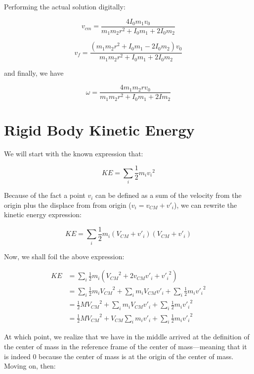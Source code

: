 \documentclass[letterpaper]{article}
\begin{document}
Performing the actual solution digitally:

\begin{equation}
   v_{cm} = \frac{4I_0m_1v_0}{m_1m_2r^2+I_0m_1+2I_0m_2} 
\end{equation}

\begin{equation}
   v_f = \frac{(m_1m_2r^2 + I_0m_1 - 2I_0m_2)v_0}{m_1m_2r^2 + I_0m_1+2I_0m_2} 
\end{equation}

and finally, we have

\begin{equation}
   \omega = \frac{4m_1m_2rv_0}{m_1m_2r^2+I_0m_1+2Im_2} 
\end{equation}

\section{Rigid Body Kinetic Energy}
\label{sec:org9559dec}
We will start with the known expression that:

\begin{equation}
   KE = \sum_i \frac{1}{2} m_i{v_i}^2
\end{equation}

Because of the fact a point \(v_i\) can be defined as a sum of the velocity from the origin plus the displace from from origin (\(v_i = v_{CM}+v'_i\)), we can rewrite the kinetic energy expression:

\begin{equation}
   KE = \sum_i  \frac{1}{2}  m_i (V_{CM}+v'_i)(V_{CM}+v'_i)
\end{equation}

Now, we shall foil the above expression:

\begin{align}
   KE &= \sum_i  \frac{1}{2}  m_i ({V_{CM}}^2+2v_{CM}v'_i+{v'_i}^2) \\
&= \sum_i  \frac{1}{2}  m_i {V_{CM}}^2+ \sum_i  m_i V_{CM}v'_i+\sum_i  \frac{1}{2}  m_i {v'_i}^2 \\
&= \frac{1}{2}  M {V_{CM}}^2+ \sum_i  m_i V_{CM}v'_i+\sum_i  \frac{1}{2} m_i {v'_i}^2 \\
&= \frac{1}{2}  M {V_{CM}}^2+ V_{CM}\sum_i  m_i v'_i+\sum_i  \frac{1}{2} m_i {v'_i}^2 
\end{align}

At which point, we realize that we have in the middle arrived at the definition of the center of mass in the reference frame of the center of mass---meaning that it is indeed \(0\) because the center of mass is at the origin of the center of mass. Moving on, then:
\end{document}

